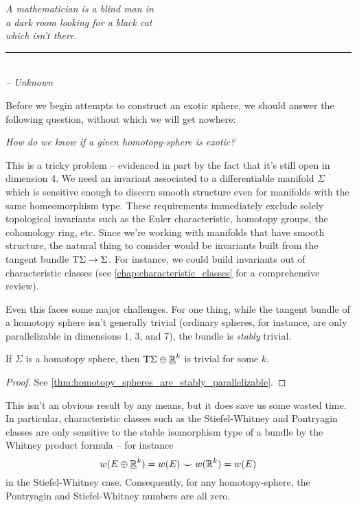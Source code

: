 \providecommand{\bo}{\Sigma}
\providecommand{\co}{B}

\begin{flushleft}
	\textsl{A mathematician is a blind man in }\\
	\textsl{a dark room looking for a black cat}\\
	\textsl{which isn’t there.}\\
	\rule[0pt]{15em}{0.5pt}\\
	\textsl{-- Unknown}
	\vspace{2em}
\end{flushleft}

Before we begin attempts to construct an exotic sphere, we should answer the following question, without which we will get nowhere:
\begin{center}
	\textsl{How do we know if a given homotopy-sphere is exotic?}
\end{center}

This is a tricky problem -- evidenced in part by the fact that it's still open in dimension 4. We need an invariant associated to a differentiable manifold $\Sigma$ which is sensitive enough to discern smooth structure even for manifolds with the same homeomorphism type.
These requirements immediately exclude solely topological invariants such as the Euler characteristic, homotopy groups, the cohomology ring, etc. Since we're working with manifolds that have smooth structure, the natural thing to consider would be invariants built from the tangent bundle $\mathrm{T} \Sigma \to \Sigma$. For instance, we could build invariants out of characteristic classes (see \cref{chap:characteristic_classes} for a comprehensive review).

Even this faces some major challenges. For one thing, while the tangent bundle of a homotopy sphere isn't generally trivial (ordinary spheres, for instance, are only parallelizable in dimensions $1$, $3$, and $7$), the bundle is \emph{stably} trivial.
\begin{theorem*}
	If $\Sigma$ is a homotopy sphere, then $\mathrm{T} \Sigma \oplus \underline{\mathbb{R}}^k$ is trivial for some $k$.
\end{theorem*}
\begin{proof}
	See \cref{thm:homotopy_spheres_are_stably_parallelizable}.
\end{proof}
This isn't an obvious result by any means, but it does save us some wasted time. In particular, characteristic classes such as the Stiefel-Whitney and Pontryagin classes are only sensitive to the stable isomorphism type of a bundle by the Whitney product formula -- for instance
\[
	w(E\oplus\underline{\mathbb{R}}^k) = w(E)\smile w(\mathbb{R}^k) = w(E)
\]
in the Stiefel-Whitney case. Consequently, for any homotopy-sphere, the Pontryagin and Stiefel-Whitney numbers are all zero.

